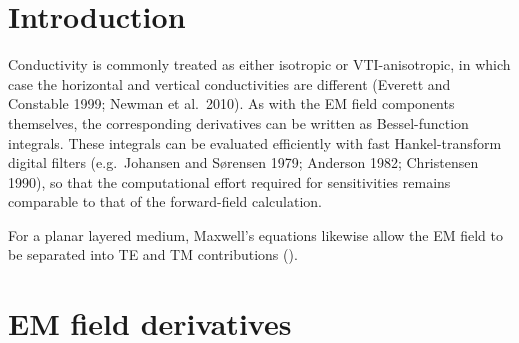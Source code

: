 \documentclass[12pt]{report}
\begin{document}
\section{Introduction}
Conductivity is commonly treated as either isotropic or VTI-anisotropic,
in which case the horizontal and vertical conductivities are different
(Everett and Constable 1999; Newman et al.\ 2010). As with the EM field
components themselves, the corresponding derivatives can be written as
Bessel-function integrals. These integrals can be evaluated efficiently
with fast Hankel-transform digital filters
(e.g.\ Johansen and S{\o}rensen 1979; Anderson 1982; Christensen 1990),
so that the computational effort required for sensitivities remains
comparable to that of the forward-field calculation.

For a planar layered medium, Maxwell's equations likewise allow the EM
field to be separated into TE and TM contributions
().

\section{EM field derivatives}
\end{document}

